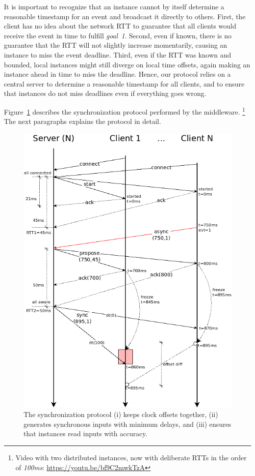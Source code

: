 \documentclass[sigplan,screen]{acmart}
\begin{document}
It is important to recognize that an instance cannot by itself determine a
reasonable timestamp for an event and broadcast it directly to others.
%
First, the client has no idea about the network RTT to guarantee that all
clients would receive the event in time to fulfill \emph{goal~1}.
%
Second, even if known, there is no guarantee that the RTT will not slightly
increase momentarily, causing an instance to miss the event deadline.
%
Third, even if the RTT was known and bounded, local instances might still
diverge on local time offsets, again making an instance ahead in time to miss
the deadline.
%
Hence, our protocol relies on a central server to determine a reasonable
timestamp for all clients, and to ensure that instances do not miss deadlines
even if everything goes wrong.

Figure~\ref{fig.protocol} describes the synchronization protocol performed by
the middleware.%
\footnote {
    Video with two distributed instances, now with deliberate RTTs in the order
    of \emph{100ms}: \url{https://youtu.be/bf9C2mwkTzA}
}
The next paragraphs explains the protocol in detail.

\begin{figure}[t]
  \centering
  \includegraphics[width=\linewidth]{protocol}
  \caption{
    \label{fig.protocol}
    The synchronization protocol
        (i) keeps clock offsets together,
        (ii) generates synchronous inputs with minimum delays, and
        (iii) ensures that instances read inputs with accuracy.
  }
\end{figure}
\end{document}
